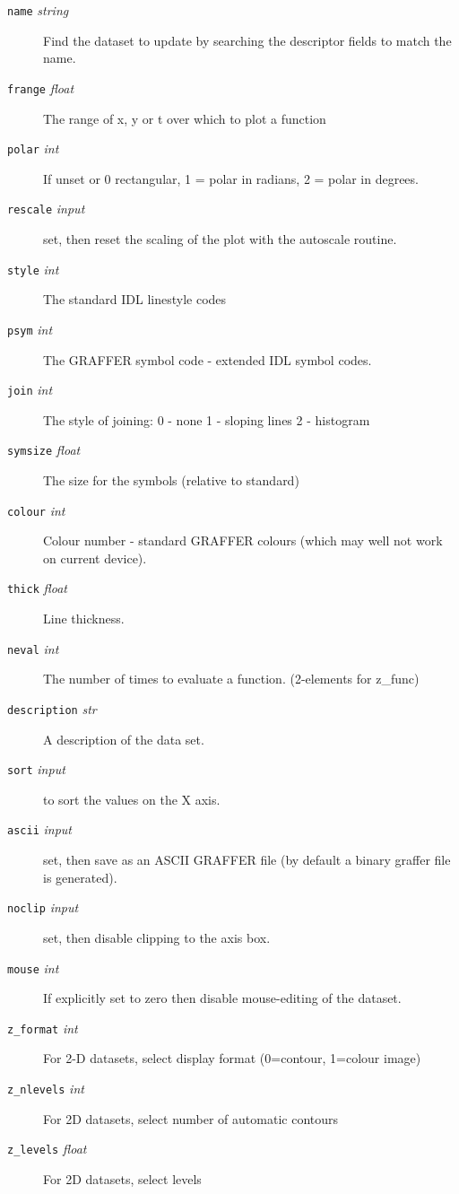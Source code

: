 \documentclass[11pt,twoside,english]{article}
\begin{document}
\begin{description}
\item[\texttt{name} \textit{string}] Find the dataset to update by
  searching the descriptor fields to match the name.
\item[\texttt{frange} \textit{float}] The range of x, y or t over which
  to plot a function
\item[\texttt{polar} \textit{int}] If unset or 0 rectangular, 1 = polar
  in radians, 2 = polar in degrees.
\item[\texttt{rescale} \textit{input}] set, then reset the scaling of
  the plot with the autoscale routine.
\item[\texttt{style} \textit{int}] The standard IDL linestyle codes
\item[\texttt{psym} \textit{int}] The GRAFFER symbol code - extended
  IDL symbol codes.
\item[\texttt{join} \textit{int}] The style of joining: 0 - none 1 -
  sloping lines 2 - histogram
\item[\texttt{symsize} \textit{float}] The size for the symbols
  (relative to standard)
\item[\texttt{colour} \textit{int}] Colour number - standard GRAFFER
  colours (which may well not work on current device).
\item[\texttt{thick} \textit{float}] Line thickness.
\item[\texttt{neval} \textit{int}] The number of times to evaluate a
  function. (2-elements for z\_func)
\item[\texttt{description} \textit{str}] A description of the data set.
\item[\texttt{sort} \textit{input}] to sort the values on the X axis.
\item[\texttt{ascii} \textit{input}] set, then save as an ASCII GRAFFER
  file (by default a binary graffer file is generated).
\item[\texttt{noclip} \textit{input}] set, then disable clipping to the
  axis box.
\item[\texttt{mouse} \textit{int}] If explicitly set to zero then
  disable mouse-editing of the dataset.
\item[\texttt{z\_format} \textit{int}] For 2-D datasets, select display
  format (0=contour, 1=colour image)
\item[\texttt{z\_nlevels} \textit{int}] For 2D datasets, select number
  of automatic contours
\item[\texttt{z\_levels} \textit{float}] For 2D datasets, select levels

\end{description}
\end{document}
